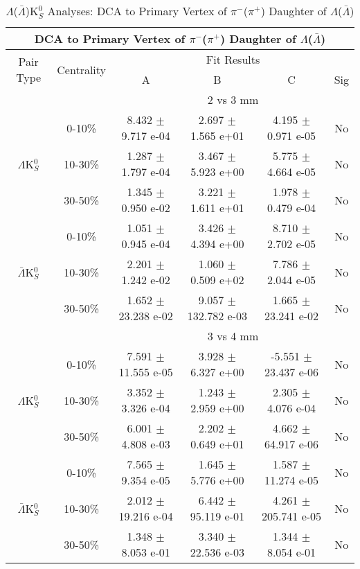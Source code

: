 \documentclass[../AnalysisNoteJBuxton.tex]{subfiles}
\begin{document}
\begin{table}
 \centering
 \begin{tabular}{|c|c|c|c|c|c|}
  \multicolumn{6}{c}{DCA to Primary Vertex of $\pi^{-}$($\pi^{+}$) Daughter of $\Lambda$($\bar{\Lambda}$)} \\
  \hline
  \multirow{2}{*}{Pair Type} & \multirow{2}{*}{Centrality} & \multicolumn{4}{c|}{Fit Results} \\
  \cline{3-6}
   & & A & B & C & Sig \\  
  \hline
  \multicolumn{2}{|c}{} & \multicolumn{4}{c|}{2 vs 3 mm} \\  
  \hline  
  \multirow{3}{*}{$\Lambda$K$^{0}_{S}$}
   &  0-10\% & 8.432 $\pm$ 9.717 e-04 & 2.697 $\pm$ 1.565 e+01 & 4.195 $\pm$ 0.971 e-05 & No \\
   & 10-30\% & 1.287 $\pm$ 1.797 e-04 & 3.467 $\pm$ 5.923 e+00 & 5.775 $\pm$ 4.664 e-05 & No \\
   & 30-50\% & 1.345 $\pm$ 0.950 e-02 & 3.221 $\pm$ 1.611 e+01 & 1.978 $\pm$ 0.479 e-04 & No \\
  \hline
  \multirow{3}{*}{$\bar{\Lambda}$K$^{0}_{S}$}  
   &  0-10\% & 1.051 $\pm$ 0.945 e-04 & 3.426 $\pm$ 4.394 e+00 & 8.710 $\pm$ 2.702 e-05 & No \\
   & 10-30\% & 2.201 $\pm$ 1.242 e-02 & 1.060 $\pm$ 0.509 e+02 & 7.786 $\pm$ 2.044 e-05 & No \\
   & 30-50\% & 1.652 $\pm$ 23.238 e-02 & 9.057 $\pm$ 132.782 e-03 & 1.665 $\pm$ 23.241 e-02 & No \\
  \hline 
  \multicolumn{2}{|c}{} & \multicolumn{4}{c|}{3 vs 4 mm} \\
  \hline  
  \multirow{3}{*}{$\Lambda$K$^{0}_{S}$}   
   &  0-10\% & 7.591 $\pm$ 11.555 e-05 & 3.928 $\pm$ 6.327 e+00 & -5.551 $\pm$ 23.437 e-06 & No \\
   & 10-30\% & 3.352 $\pm$ 3.326 e-04 & 1.243 $\pm$ 2.959 e+00 & 2.305 $\pm$ 4.076 e-04 & No \\
   & 30-50\% & 6.001 $\pm$ 4.808 e-03 & 2.202 $\pm$ 0.649 e+01 & 4.662 $\pm$ 64.917 e-06 & No \\
  \hline  
  \multirow{3}{*}{$\bar{\Lambda}$K$^{0}_{S}$}
   &  0-10\% & 7.565 $\pm$ 9.354 e-05 & 1.645 $\pm$ 5.776 e+00 & 1.587 $\pm$ 11.274 e-05 & No \\
   & 10-30\% & 2.012 $\pm$ 19.216 e-04 & 6.442 $\pm$ 95.119 e-01 & 4.261 $\pm$ 205.741 e-05 & No \\
   & 30-50\% & 1.348 $\pm$ 8.053 e-01 & 3.340 $\pm$ 22.536 e-03 & 1.344 $\pm$ 8.054 e-01 & No \\
  \hline
 \end{tabular}
 \caption{$\Lambda$($\bar{\Lambda}$)K$^{0}_{S}$ Analyses: DCA to Primary Vertex of $\pi^{-}$($\pi^{+}$) Daughter of $\Lambda$($\bar{\Lambda}$)}
 \label{tab:DcaToPrimVertexPionDaughtOfLamLamK0Full}
\end{table}
\end{document}
